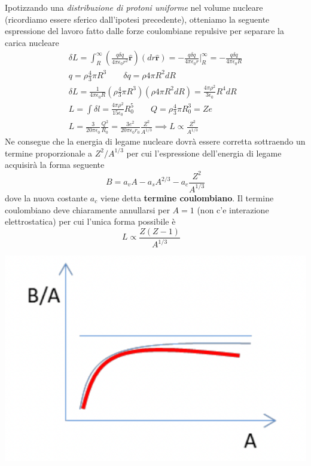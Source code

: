 Ipotizzando una \emph{distribuzione di protoni uniforme} nel volume
nucleare (ricordiamo essere sferico dall'ipotesi precedente), otteniamo
la seguente espressione del lavoro fatto dalle forze coulombiane
repulsive per separare la carica nucleare
\begin{gather*}
	\delta L = \int _{R}^{\infty} \left( \frac{q \delta q}{4 \pi \epsilon_{0}r^{2}}  \hat{\bm{r}} \right)(dr \hat{\bm{r}})=
	- \frac{q \delta q}{4 \pi \epsilon_{0}r} \bigg |_{R}^{\infty} =
	- \frac{q \delta q}{4 \pi \epsilon_{0}R}\\
	q = \rho \frac{ 4}{3} \pi R^{3} \qquad \delta q = \rho 4 \pi R^{2} dR\\
	\delta L = \frac{1}{4 \pi \epsilon_{0}R}\left( \rho \frac{ 4}{3}\pi R^{3} \right)(\rho 4 \pi R^{2} dR) = \frac{4 \pi \rho^{2}}{3 \epsilon_{0}}R^{4}dR\\
	L = \int \delta l = \frac{4 \pi \rho^{2}}{15 \epsilon_{0}}R_{0}^{5} \qquad Q = \rho \frac{ 4}{3} \pi R_{0}^{3} = Ze\\
	L = \frac{3}{20 \pi \epsilon_{0}} \frac{Q^{2}}{R_{0}} = \frac{3e^{2}}{20 \pi \epsilon_{0}r_{0}} \frac{Z^{2}}{A^{1/3}}
	\implies L \propto \frac{ Z^{2}}{A^{1/3}}
\end{gather*} Ne consegue che la energia di legame nucleare dovrà essere corretta
sottraendo un termine proporzionale a \(Z^{2} / A^{1/3}\) per cui
l'espressione dell'energia di legame acquisirà la forma seguente
\begin{equation}
	B = a_{v}A - a_{s}A^{2/3} - a_{c} \frac{Z^{2}}{A^{1/3}}
	\label{eq:coulomb-term-drop-model}
\end{equation}
 dove la nuova costante \(a_{c}\) viene detta \textbf{termine
	coulombiano}.
Il termine coulombiano deve chiaramente annullarsi per
\(A=1\) (non c'e interazione elettrostatica) per cui l'unica forma
possibile è
\begin{equation}
	L \propto \frac{Z(Z-1)}{A^{1/3}} \quad
   \label{eq:work-to-seperate-uniformly-distributed-protons}
\end{equation}
\begin{marginfigure}
	\includegraphics{figs/goccia3}
	\label{fig:goccia3}
\end{marginfigure}

